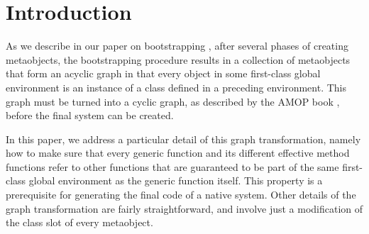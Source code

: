 \section{Introduction}
\label{sec-introduction}

As we describe in our paper on bootstrapping
\cite{Durand-Strandh:2019:ELS:Bootstrapping}, after several phases of
creating metaobjects, the bootstrapping procedure results in a
collection of metaobjects that form an acyclic graph in that every
object in some first-class global environment is an instance of a
class defined in a preceding environment.  This graph must be turned
into a cyclic graph, as described by the AMOP book
\cite{Kiczales:1991:AMP:574212}, before the final system can be
created.

In this paper, we address a particular detail of this graph
transformation, namely how to make sure that every generic function
and its different effective method functions refer to other functions
that are guaranteed to be part of the same first-class global
environment as the generic function itself.  This property is a
prerequisite for generating the final code of a native \sicl{}
system. Other details of the graph transformation are fairly
straightforward, and involve just a modification of the class slot of
every metaobject.
